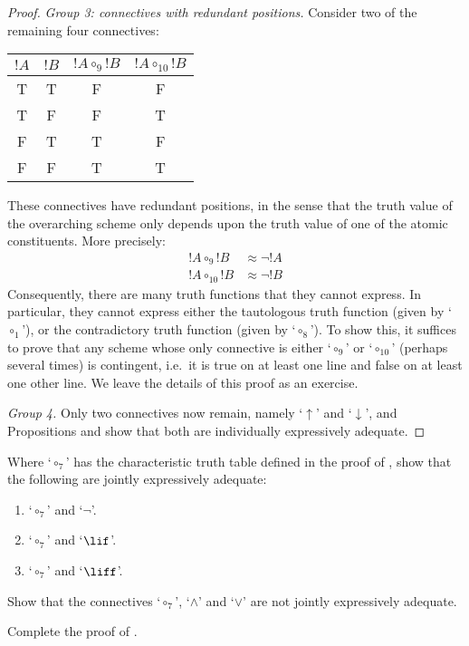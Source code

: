\documentclass[../../../include/open-logic-section]{subfiles}
\begin{document}
\begin{thm}
\begin{proof}
		\emph{Group 3: connectives with redundant positions.} 
		Consider two of the remaining four connectives:
		
	\begin{center}
		\begin{tabular}{c c | c c}
		${!A}$ & ${!B}$ & ${!A} \mathrel{\circ_9} {!B}$ & ${!A} \mathrel{\circ_{10}} {!B}$\\
		\hline
			 T & T & F & F \\
			 T & F & F & T\\
			 F & T & T & F \\
			 F & F & T & T
	\end{tabular}
	\end{center}
	These connectives have redundant positions, in the sense that the truth value of the overarching scheme only depends upon the truth value of one of the atomic constituents. More precisely:
		\begin{align*}
		 	{!A} \circ_9 {!B} &\approx \lnot {!A}\\
			{!A} \circ_{10} {!B} &\approx \lnot {!B}
		\end{align*}
		Consequently, there are many truth functions that they cannot express. In particular, they cannot express either the tautologous truth function (given by `$\circ_1$'), or the contradictory truth function (given by `$\circ_8$'). To show this, it suffices to prove that any scheme whose only connective is either `$\circ_9$' or `$\circ_{10}$' (perhaps several times) is contingent, i.e.\ it is true on at least one line and false on at least one other line. We leave the details of this proof as an exercise.
		
		\emph{Group 4.} Only two connectives now remain, namely `$\uparrow$' and `$\downarrow$', and 	Propositions  and  show that both are individually expressively adequate.
		\end{proof}
	\end{thm}

\begin{prob}
 Where `$\circ_7$' has the characteristic truth table defined in the proof of , show that the following are jointly expressively adequate:
	\begin{enumerate}
		\item `$\circ_7$' and `$\lnot$'. %
		\item `$\circ_7$' and `$\lif$'. %
		\item `$\circ_7$' and `$\liff$'. %
	\end{enumerate}
\end{prob}

\begin{prob}
Show that the connectives `$\circ_7$', `$\land$' and `$\lor$' are not jointly expressively adequate.\\
\end{prob}

\begin{prob}
Complete the proof of .
\end{prob}

 
\end{document}
